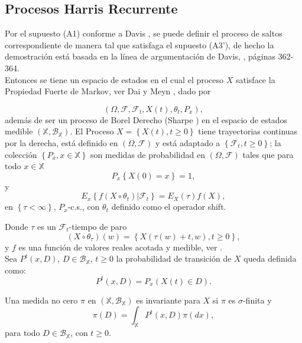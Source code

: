 \subsection{Procesos Harris Recurrente}

Por el supuesto (A1) conforme a Davis \cite{Davis}, se puede
definir el proceso de saltos correspondiente de manera tal que
satisfaga el supuesto (A3'), de hecho la demostraci\'on est\'a
basada en la l\'inea de argumentaci\'on de Davis, \cite{Davis},
p\'aginas 362-364.\\

Entonces se tiene un espacio de estados en el cual el proceso $X$
satisface la Propiedad Fuerte de Markov, ver Dai y Meyn
\cite{DaiSean}, dado por

\[\left(\Omega,\mathcal{F},\mathcal{F}_{t},X\left(t\right),\theta_{t},P_{x}\right),\]
adem\'as de ser un proceso de Borel Derecho (Sharpe \cite{Sharpe})
en el espacio de estados medible
$\left(\mathbb{X},\mathcal{B}_\mathbb{X}\right)$. El Proceso
$X=\left\{X\left(t\right),t\geq0\right\}$ tiene trayectorias
continuas por la derecha, est\'a definido en
$\left(\Omega,\mathcal{F}\right)$ y est\'a adaptado a
$\left\{\mathcal{F}_{t},t\geq0\right\}$; la colecci\'on
$\left\{P_{x},x\in \mathbb{X}\right\}$ son medidas de probabilidad
en $\left(\Omega,\mathcal{F}\right)$ tales que para todo $x\in
\mathbb{X}$
\[P_{x}\left\{X\left(0\right)=x\right\}=1,\] y
\[E_{x}\left\{f\left(X\circ\theta_{t}\right)|\mathcal{F}_{t}\right\}=E_{X}\left(\tau\right)f\left(X\right),\]
en $\left\{\tau<\infty\right\}$, $P_{x}$-c.s., con $\theta_{t}$
definido como el operador shift.


Donde $\tau$ es un $\mathcal{F}_{t}$-tiempo de paro
\[\left(X\circ\theta_{\tau}\right)\left(w\right)=\left\{X\left(\tau\left(w\right)+t,w\right),t\geq0\right\},\]
y $f$ es una funci\'on de valores reales acotada y medible, ver \cite{Dai, KaspiMandelbaum}.\\

Sea $P^{t}\left(x,D\right)$, $D\in\mathcal{B}_{\mathbb{X}}$,
$t\geq0$ la probabilidad de transici\'on de $X$ queda definida
como:
\[P^{t}\left(x,D\right)=P_{x}\left(X\left(t\right)\in
D\right).\]


\begin{Def}
Una medida no cero $\pi$ en
$\left(\mathbb{X},\mathcal{B}_{\mathbb{X}}\right)$ es invariante
para $X$ si $\pi$ es $\sigma$-finita y
\[\pi\left(D\right)=\int_{\mathbb{X}}P^{t}\left(x,D\right)\pi\left(dx\right),\]
para todo $D\in \mathcal{B}_{\mathbb{X}}$, con $t\geq0$.
\end{Def}

